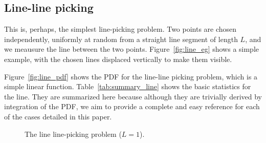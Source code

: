 \subsection{Line-line picking}
\label{sec:line_line}

This is, perhaps, the simplest line-picking problem. Two points are
chosen independently, uniformly at random from a straight line segment
of length $L$, and we meausure the line between the two
points. Figure~\ref{fig:line_eg} shows a simple example, with the
chosen lines displaced vertically to make them visible.

Figure~\ref{fig:line_pdf} shows the PDF for the line-line
picking problem, which is a simple linear
function. Table~\ref{tab:summary_line} shows the basic statistics for
the line. They are summarized here because although they are trivially
derived by integration of the PDF, we aim to provide a complete and
easy reference for each of the cases detailed in this paper.

\begin{figure}[htbp]
  \begin{center}
       \hspace{0.075\columnwidth}
    \caption{The line line-picking problem ($L=1$).}
  \end{center}
\vspace{-4mm}
\end{figure}

